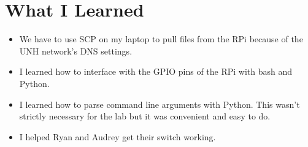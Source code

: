 \documentclass{article}
\begin{document}
\section{What I Learned}
\begin{itemize}
    \item We have to use SCP on my laptop to pull files from the RPi because of the UNH network's DNS settings.
    \item I learned how to interface with the GPIO pins of the RPi with bash and Python. 
    \item I learned how to parse command line arguments with Python. This wasn't strictly necessary for the lab but it was convenient and easy to do. 
    \item I helped Ryan and Audrey get their switch working. 
\end{itemize}
\end{document}
